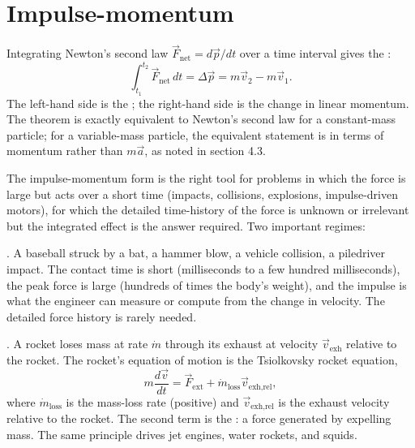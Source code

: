 \section{Impulse-momentum}

Integrating Newton's second law $\vec{F}_{\text{net}} = d\vec{p}/dt$
over a time interval gives the :
\[
\int_{t_1}^{t_2} \vec{F}_{\text{net}} \,dt = \Delta \vec{p} = m\vec{v}_2
- m\vec{v}_1.
\]
The left-hand side is the ; the right-hand side is
the change in linear momentum. The theorem is exactly equivalent to
Newton's second law for a constant-mass particle; for a variable-mass
particle, the equivalent statement is in terms of momentum rather
than $m\vec{a}$, as noted in section 4.3.

The impulse-momentum form is the right tool for problems in which the
force is large but acts over a short time (impacts, collisions,
explosions, impulse-driven motors), for which the detailed
time-history of the force is unknown or irrelevant but the integrated
effect is the answer required. Two important regimes:

. A baseball struck by a bat, a hammer blow,
a vehicle collision, a piledriver impact. The contact time is short
(milliseconds to a few hundred milliseconds), the peak force is
large (hundreds of times the body's weight), and the impulse is what
the engineer can measure or compute from the change in velocity. The
detailed force history is rarely needed.

. A rocket loses mass at rate $\dot{m}$
through its exhaust at velocity $\vec{v}_{\text{exh}}$ relative to the
rocket. The rocket's equation of motion is the Tsiolkovsky rocket
equation,
\[
m\frac{d\vec{v}}{dt} = \vec{F}_{\text{ext}} + \dot{m}_{\text{loss}}
\vec{v}_{\text{exh,rel}},
\]
where $\dot{m}_{\text{loss}}$ is the mass-loss rate (positive) and
$\vec{v}_{\text{exh,rel}}$ is the exhaust velocity relative to the
rocket. The second term is the : a force generated by
expelling mass. The same principle drives jet engines, water rockets,
and squids.


